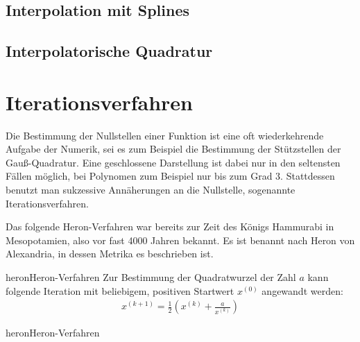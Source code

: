 \section{Interpolation mit Splines}


%

\section{Interpolatorische Quadratur}


\chapter{Iterationsverfahren}
\begin{intro}
  Die Bestimmung der Nullstellen einer Funktion ist eine oft
  wiederkehrende Aufgabe der Numerik, sei es zum Beispiel die
  Bestimmung der Stützstellen der Gauß-Quadratur. Eine geschlossene
  Darstellung ist dabei nur in den seltensten Fällen möglich, bei
  Polynomen zum Beispiel nur bis zum Grad 3. Stattdessen benutzt man
  sukzessive Annäherungen an die Nullstelle, sogenannte
  Iterationsverfahren.

  Das folgende Heron-Verfahren war bereits zur Zeit des Königs
  Hammurabi in Mesopotamien, also vor fast 4000 Jahren bekannt. Es ist
  benannt nach Heron von Alexandria, in dessen Metrika es beschrieben
  ist.
\end{intro}

\begin{Definition*}{heron}{Heron-Verfahren}
  Zur Bestimmung der Quadratwurzel der Zahl $a$ kann folgende
  Iteration mit beliebigem, positiven Startwert $x^{(0)}$ angewandt
  werden:
  \begin{gather}
    x^{(k+1)} = \frac12\left(x^{(k)} + \frac{a}{x^{(k)}}\right)
  \end{gather}
\end{Definition*}

\begin{Algorithmus*}{heron}{Heron-Verfahren}
  
\end{Algorithmus*}

